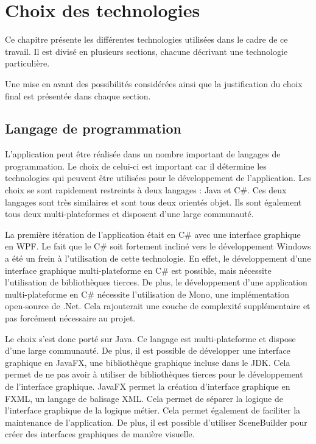\section{Choix des technologies}
Ce chapitre présente les différentes technologies utilisées dans le cadre de ce travail. Il est divisé en plusieurs sections, chacune décrivant une technologie particulière.

Une mise en avant des possibilités considérées ainsi que la justification du choix final est présentée dans chaque section.

\subsection{Langage de programmation}
L'application peut être réalisée dans un nombre important de langages de programmation. Le choix de celui-ci est important car il détermine les technologies qui peuvent être utilisées pour le développement de l'application.
Les choix se sont rapidement restreints à deux langages : Java et C#. Ces deux langages sont très similaires et sont tous deux orientés objet. Ils sont également tous deux multi-plateformes et disposent d'une large communauté.

La première itération de l'application était en C# avec une interface graphique en WPF. Le fait que le C# soit fortement incliné vers le développement Windows a été un frein à l'utilisation de cette technologie. En effet, le développement d'une interface graphique multi-plateforme en C# est possible, mais nécessite l'utilisation de bibliothèques tierces. De plus, le développement d'une application multi-plateforme en C# nécessite l'utilisation de Mono, une implémentation open-source de .Net. Cela rajouterait une couche de complexité supplémentaire et pas forcément nécessaire au projet.

Le choix s'est donc porté sur Java. Ce langage est multi-plateforme et dispose d'une large communauté. De plus, il est possible de développer une interface graphique en JavaFX, une bibliothèque graphique incluse dans le JDK. Cela permet de ne pas avoir à utiliser de bibliothèques tierces pour le développement de l'interface graphique. JavaFX permet la création d'interface graphique en FXML, un langage de balisage XML. Cela permet de séparer la logique de l'interface graphique de la logique métier. Cela permet également de faciliter la maintenance de l'application. De plus, il est possible d'utiliser SceneBuilder pour créer des interfaces graphiques de manière visuelle.

